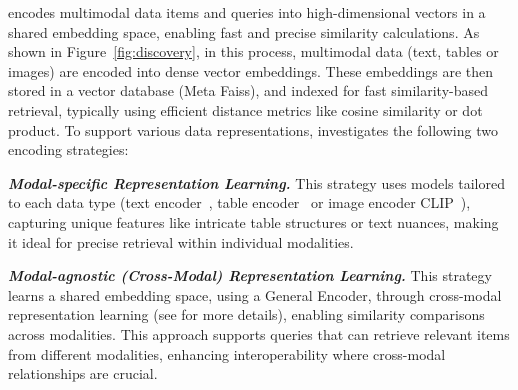  encodes multimodal data items and queries into high-dimensional vectors in a shared embedding space, enabling fast and precise similarity calculations. As shown in Figure~\ref{fig:discovery}, in this process, multimodal data (\eg text, tables or images) are encoded into dense vector embeddings. These embeddings are then stored in a vector database (\eg Meta Faiss), and indexed for fast similarity-based retrieval, typically using efficient distance metrics like cosine similarity or dot product.
%
To support various data representations, \sys investigates the following two encoding strategies:

\be
	\itemsep-1mm 
	\item \textbf{\textit{Modal-specific Representation Learning.}} 
	This strategy uses models tailored to each data type (\eg text encoder~\cite{karpukhin-etal-2020-dense}, table encoder~\cite{rpt} or image encoder CLIP~\cite{radford2021learning}), capturing unique features like intricate table structures or text nuances, making it ideal for precise retrieval within individual modalities. %

	\item \textbf{\textit{Modal-agnostic (Cross-Modal) Representation Learning.}} 
	This strategy learns a shared embedding space, using a General Encoder, through cross-modal representation learning (see \cite{symphony} for more details), enabling similarity comparisons across modalities. This approach supports queries that can retrieve relevant items from different modalities, enhancing interoperability where cross-modal relationships are crucial. %
\ee


